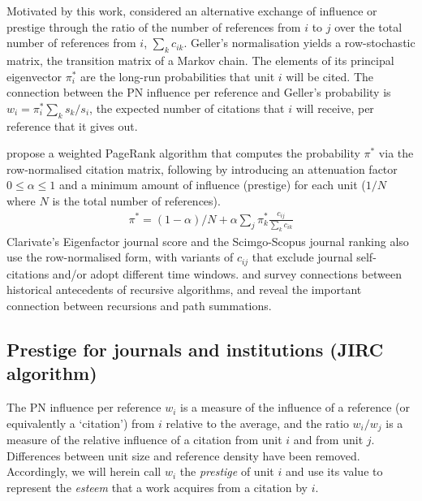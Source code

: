 \documentclass[10pt]{article}
\begin{document}
Motivated by this work, \cite{gellerCitationInfluenceMethodology1978} considered an alternative exchange of influence or prestige through the ratio of the number of references from $i$ to $j$ over the total number of references from $i$, $\sum_k c_{ik}$. Geller's normalisation yields a row-stochastic matrix, the transition matrix of a Markov chain. The elements of its principal eigenvector $\pi^*_i$ are the long-run probabilities that unit $i$ will be cited. The connection between the PN influence per reference and Geller's probability is $w_i = \pi^*_i \sum_k s_k / s_i$,  the expected number of citations that $i$ will receive, per reference that it gives out. 

\cite{bollenJournalStatus2006a} propose a weighted PageRank algorithm that computes the probability $\pi^*$ via the row-normalised citation matrix, following \cite{brinAnatomyLargescaleHypertextual1998a} by introducing an attenuation factor $0 \le \alpha \le 1$ and a minimum amount of influence (prestige) for each unit ($1/N$ where $N$ is the total number of references).
\begin{align}
	\pi^* = (1-\alpha)/N + \alpha \sum_j \pi^*_k \frac{c_{ij}}{\sum_k c_{ik}}
\end{align}
Clarivate's Eigenfactor journal score \citep{bergstromEigenfactorMeasuringValue2007, westEigenfactorMetricsNetwork2010} and the Scimgo-Scopus journal ranking \citep{gonzalez-pereiraNewApproachMetric2010,guerrero-boteFurtherStepForward2012} also use the row-normalised form, with variants of $c_{ij}$ that exclude journal self-citations and/or adopt different time windows. \cite{vigna} and \cite{waltmanRelationEigenfactorAudience2010} survey connections between historical antecedents of recursive algorithms, and reveal the important connection between recursions and path summations.

\subsection{Prestige for journals and institutions (JIRC algorithm)}

The PN influence per reference $w_i$ is a measure of the influence of a reference (or equivalently a `citation') from $i$ relative to the average, and the ratio $w_i/w_j$ is a measure of the relative influence of a citation from unit $i$ and from unit $j$. Differences between unit size and reference density have been removed. Accordingly, we will herein call $w_i$ the \textit{prestige} of unit $i$ and use its value to represent the \textit{esteem} that a work acquires from a citation by $i$. 
\end{document}
